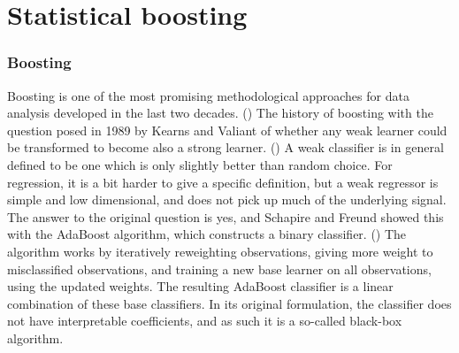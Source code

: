 \chapter{Statistical boosting}
\subsection{Boosting}
Boosting is one of the most promising methodological approaches for data analysis developed in the last two decades. (\cite{mayr14a}) The history of boosting with the question posed in 1989 by Kearns and Valiant of whether any weak learner could be transformed to become also a strong learner. (\cite{kearnsvaliant}) A weak classifier is in general defined to be one which is only slightly better than random choice. For regression, it is a bit harder to give a specific definition, but a weak regressor is simple and low dimensional, and does not pick up much of the underlying signal. The answer to the original question is yes, and Schapire and Freund showed this with the AdaBoost algorithm, which constructs a binary classifier. (\cite{adaboost}) The algorithm works by iteratively reweighting observations, giving more weight to misclassified observations, and training a new base learner on all observations, using the updated weights. The resulting AdaBoost classifier is a linear combination of these base classifiers. In its original formulation, the classifier does not have interpretable coefficients, and as such it is a so-called black-box algorithm.


